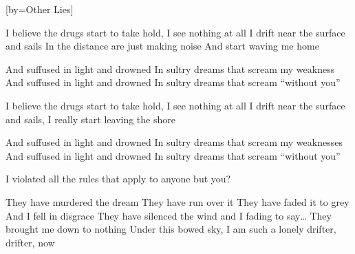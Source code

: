 [by={Other Lies}]

  \chordsoff
  \beginverse
  I believe the drugs start to take hold,
  I see nothing at all
  I drift near the surface and sails
  In the distance are just making noise
  And start waving me home
  \endverse

  \beginchorus
  And suffused in light and drowned
  In sultry dreams that scream my weakness
  And suffused in light and drowned
  In sultry dreams that scream “without you”
  \endchorus

  \beginverse
  I believe the drugs start to take hold,
  I see nothing at all
  I drift near the surface and sails,
  I really start leaving the shore
  \endverse

  \beginchorus
  And suffused in light and drowned
  In sultry dreams that scream my weaknesses
  And suffused in light and drowned
  In sultry dreams that scream “without you”
  \endchorus

  \beginverse
  I violated all the rules that apply to anyone but you? 
  \endverse

  \beginverse
  They have murdered the dream
  They have run over it
  They have faded it to grey
  And I fell in disgrace 
  They have silenced the wind
  and I fading to say… 
  They brought me down to nothing 
  Under this bowed sky,
  I am such a lonely drifter, drifter, now
  \endverse
\endsong
